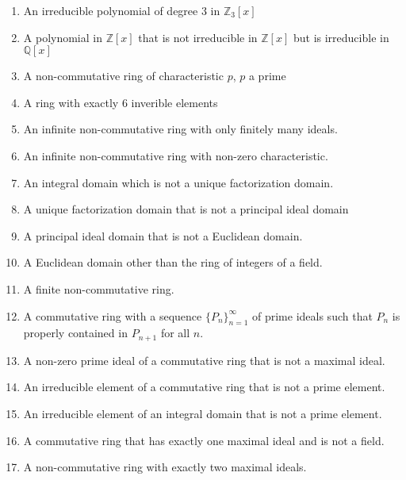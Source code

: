 \documentclass{article}
\theoremstyle{definition}
\begin{document}
\begin{enumerate}
            \begin{enumerate}
                \item An irreducible polynomial of degree 3 in $\mathbb{Z}_3[x]$
                \item A polynomial in $\mathbb{Z}[x]$ that is not irreducible in $\mathbb{Z}[x]$ but is irreducible in $\mathbb{Q}[x]$
                \item A non-commutative ring of characteristic $p$, $p$ a prime 
                \item A ring with exactly 6 inverible elements
                \item An infinite non-commutative ring with only finitely many ideals.
                \item An infinite non-commutative ring with non-zero characteristic.
                \item An integral domain which is not a unique factorization domain. 
                \item A unique factorization domain that is not a principal ideal domain
                \item A principal ideal domain that is not a Euclidean domain.
                \item A Euclidean domain other than the ring of integers of a field.
                \item A finite non-commutative ring.
                \item A commutative ring with a sequence $\{P_n\}_{n=1}^{\infty}$ of prime ideals such that $P_n$ is properly contained in $P_{n+1}$ for all $n$.
                \item A non-zero prime ideal of a commutative ring that is not a maximal ideal.
                \item An irreducible element of a commutative ring that is not a prime element. 
                \item An irreducible element of an integral domain that is not a prime element. 
                \item A commutative ring that has exactly one maximal ideal and is not a field.
                \item A non-commutative ring with exactly two maximal ideals.
            \end{enumerate}


\end{enumerate}
\end{document}
